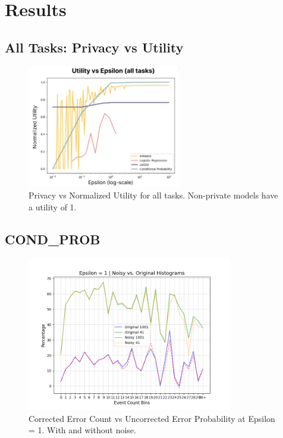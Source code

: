 \documentclass[12pt,letterpaper]{article}
\begin{document}

\section{Results}

\subsection{All Tasks: Privacy vs Utility}

\begin{figure}[H] %
  \centering
  \includegraphics[width=0.6\textwidth]{figure/meta.png} %
  \caption{Privacy vs Normalized Utility for all tasks. Non-private models have a utility of 1.}
  \label{fig:meta}
\end{figure}

\subsection{COND\_PROB}

\begin{figure}[h!]
    \centering
    \includegraphics[width=0.8\textwidth]{report/figure/histoeps1.png}
    \caption{Corrected Error Count vs Uncorrected Error Probability at Epsilon = 1. With and without noise.}
    \label{fig:yourplot}
\end{figure}
\end{document}
